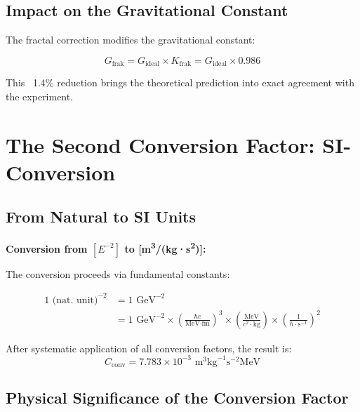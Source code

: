 \documentclass[12pt,a4paper]{article}
\begin{document}
	\subsection{Impact on the Gravitational Constant}
	
	The fractal correction modifies the gravitational constant:
	
	\begin{equation}
		G_{\text{frak}} = G_{\text{ideal}} \times K_{\text{frak}} = G_{\text{ideal}} \times 0.986
	\end{equation}
	
	This ~1.4\% reduction brings the theoretical prediction into exact agreement with the experiment.
	
	\section{The Second Conversion Factor: SI-Conversion}
	
	\subsection{From Natural to SI Units}
	
	\begin{dimensional}
		\textbf{Conversion from $[E^{-2}]$ to [m\textsuperscript{3}/(kg·s\textsuperscript{2})]:}
		
		The conversion proceeds via fundamental constants:
		
		\begin{align}
			1 \text{ (nat. unit)}^{-2} &= 1 \text{ GeV}^{-2} \\
			&= 1 \text{ GeV}^{-2} \times \left(\frac{\hbar c}{\text{MeV·fm}}\right)^3 \times \left(\frac{\text{MeV}}{c^2 \cdot \text{kg}}\right) \times \left(\frac{1}{\hbar \cdot \text{s}^{-1}}\right)^2
		\end{align}
		
		After systematic application of all conversion factors, the result is:
		\begin{equation}
			C_{\text{conv}} = 7.783 \times 10^{-3} \text{ m}^3\text{kg}^{-1}\text{s}^{-2}\text{MeV}
		\end{equation}
	\end{dimensional}
	
	\subsection{Physical Significance of the Conversion Factor}
	
\end{document}
